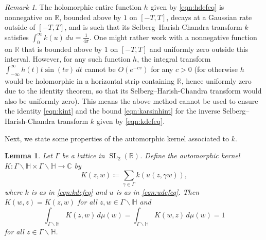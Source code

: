 \documentclass[11pt,a4paper]{amsart}
\newcommand{\C}{\mathbb{C}}
\newcommand{\Hb}{\mathbb{H}}
\newcommand{\R}{\mathbb{R}}
\DeclareMathOperator{\SL}{SL}
\numberwithin{equation}{section}
\newtheorem{lemma}[equation]{Lemma}
\theoremstyle{remark}
\newtheorem{remark}[equation]{Remark}
\theoremstyle{definition}
\begin{document}
\begin{remark}
\label{rem:cutoff}
The holomorphic entire function $h$ given by \eqref{eqn:hdefeq} is nonnegative on $\R$, bounded above by $1$ on $[-T,T]$, decays at a Gaussian rate outside of $[-T,T]$, and is such that its Selberg--Harish-Chandra transform $k$ satisfies $\int_{0}^{\infty} k(u) \, du = \frac{1}{4\pi}$. One might rather work with a nonnegative function on $\R$ that is bounded above by $1$ on $[-T,T]$ and uniformly zero outside this interval. However, for any such function $h$, the integral transform $\int_{-\infty}^{\infty} h(t) t \sin(tv) \, dt$ cannot be $O(e^{-cv})$ for any $c > 0$ (for otherwise $h$ would be holomorphic in a horizontal strip containing $\R$, hence uniformly zero due to the identity theorem, so that its Selberg--Harish-Chandra transform would also be uniformly zero). This means the above method cannot be used to ensure the identity \eqref{eqn:kint} and the bound \eqref{eqn:karsinhint} for the inverse Selberg--Harish-Chandra transform $k$ given by \eqref{eqn:kdefeq}.
\end{remark}

Next, we state some properties of the automorphic kernel associated to $k$.

\begin{lemma}
\label{lem:Kproperties}
Let $\Gamma$ be a lattice in $\SL_2(\R)$. Define the automorphic kernel $K : \Gamma \backslash \Hb \times \Gamma \backslash \Hb \to \C$ by
\begin{equation}
\label{eqn:Kdefeq}
K(z,w) \coloneqq \sum_{\gamma \in \Gamma} k(u(z,\gamma w)),
\end{equation}
where $k$ is as in \eqref{eqn:kdefeq} and $u$ is as in \eqref{eqn:udefeq}. Then $K(w,z) = K(z,w)$ for all $z,w \in \Gamma \backslash \Hb$ and
\begin{equation}
\label{eqn:Kint}
\int_{\Gamma \backslash \Hb} K(z,w) \, d\mu(w) = \int_{\Gamma \backslash \Hb} K(w,z) \, d\mu(w) = 1
\end{equation}
for all $z \in \Gamma \backslash \Hb$.
\end{lemma}
\end{document}
